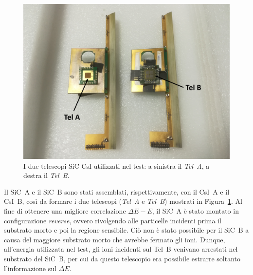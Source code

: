 \begin{figure} [!t]
	\centering
	\includegraphics[scale=0.5]{Grafici/telescopi_etichette.png}
	\caption{I due telescopi SiC-CsI utilizzati nel test: a sinistra il \emph{Tel~A}, a destra il \emph{Tel~B}.} \label{fig:telescopi}
\end{figure}






Il SiC~A e il SiC~B sono stati assemblati, rispettivamente, con il CsI~A e il CsI~B, così da formare i due telescopi (\emph{Tel~A} e \emph{Tel~B}) mostrati in Figura~\ref{fig:telescopi}.
Al fine di ottenere una migliore correlazione $\Delta E - E$, il SiC~A è stato montato in configurazione \emph{reverse}, ovvero rivolgendo alle particelle incidenti prima il substrato morto e poi la regione sensibile.
Ciò non è stato possibile per il SiC~B a causa del maggiore substrato morto che avrebbe fermato gli ioni.
Dunque, all'energia utilizzata nel test, gli ioni incidenti sul Tel~B venivano arrestati nel substrato del SiC~B, per cui da questo telescopio era possibile estrarre soltanto l'informazione sul $\Delta E$.

